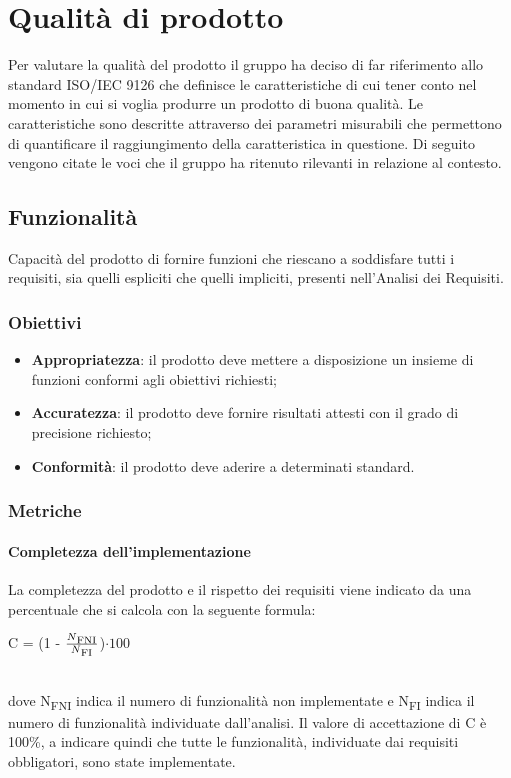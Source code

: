\section{Qualità di prodotto}
Per valutare la qualità del prodotto il gruppo ha deciso di far riferimento allo standard ISO/IEC 9126\glosp{} che definisce le caratteristiche di cui tener conto nel momento in cui si voglia produrre un prodotto di buona qualità. Le caratteristiche sono descritte attraverso dei parametri misurabili che permettono di quantificare il raggiungimento della caratteristica in questione. Di seguito vengono citate le voci che il gruppo ha ritenuto rilevanti in relazione al contesto.
	\subsection{Funzionalità}
	Capacità del prodotto di fornire funzioni che riescano a soddisfare tutti i requisiti, sia quelli espliciti che quelli impliciti, presenti nell'Analisi dei Requisiti.
		\subsubsection{Obiettivi}
		\begin{itemize}
			\item \textbf{Appropriatezza}: il prodotto deve mettere a disposizione un insieme di funzioni conformi agli obiettivi richiesti;
			\item \textbf{Accuratezza}: il prodotto deve fornire risultati attesti con il grado di precisione richiesto;
			\item \textbf{Conformità}: il prodotto deve aderire a determinati standard. %
		\end{itemize}
		\subsubsection{Metriche}
			\paragraph{Completezza dell'implementazione}
			La completezza del prodotto e il rispetto dei requisiti viene indicato da una percentuale che si calcola con la seguente formula: \\
			\centerline { C = (1 - \(\frac{N\textsubscript{FNI}}{N\textsubscript{FI}} \))$ \cdot  100$ } \\
			dove N\textsubscript{FNI} indica il numero di funzionalità non implementate e N\textsubscript{FI} indica il numero di funzionalità individuate dall'analisi. Il valore di accettazione di C è 100\%, a indicare quindi che tutte le funzionalità, individuate dai requisiti obbligatori, sono state implementate.
